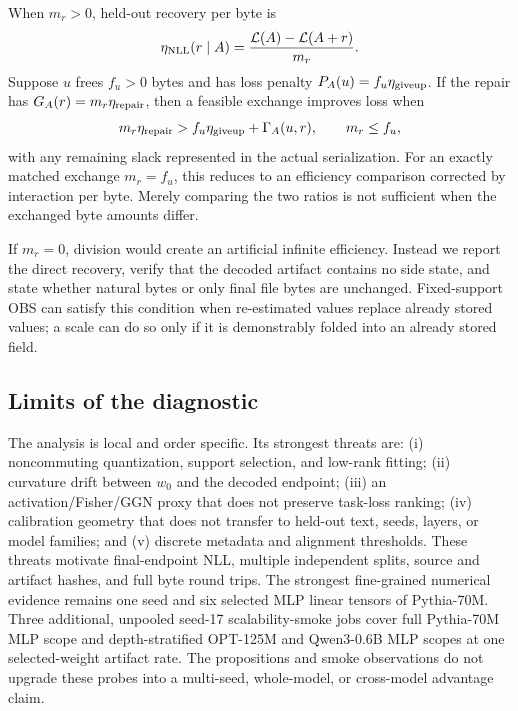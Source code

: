 When $m_r>0$, held-out recovery per byte is
\begin{equation}
\eta_{\rm NLL}(r\mid A)
=\frac{\mathcal{L}(A)-\mathcal{L}(A+r)}{m_r}.
\end{equation}
Suppose $u$ frees $f_u>0$ bytes and has loss penalty
$P_A(u)=f_u\eta_{\rm giveup}$.  If the repair has
$G_A(r)=m_r\eta_{\rm repair}$, then a feasible exchange improves loss
when
\begin{equation}
m_r\eta_{\rm repair}
>f_u\eta_{\rm giveup}+\Gamma_A(u,r),
\qquad m_r\le f_u,
\end{equation}
with any remaining slack represented in the actual serialization.
For an exactly matched exchange $m_r=f_u$, this reduces to an efficiency
comparison corrected by interaction per byte.  Merely comparing the two
ratios is not sufficient when the exchanged byte amounts differ.

If $m_r=0$, division would create an artificial infinite efficiency.
Instead we report the direct recovery, verify that the decoded artifact
contains no side state, and state whether natural bytes or only final
file bytes are unchanged.  Fixed-support OBS can satisfy this condition
when re-estimated values replace already stored values; a scale can do
so only if it is demonstrably folded into an already stored field.

\subsection{Limits of the diagnostic}

The analysis is local and order specific.  Its strongest threats are:
(i) noncommuting quantization, support selection, and low-rank fitting;
(ii) curvature drift between $w_0$ and the decoded endpoint;
(iii) an activation/Fisher/GGN proxy that does not preserve task-loss
ranking; (iv) calibration geometry that does not transfer to held-out
text, seeds, layers, or model families; and (v) discrete metadata and
alignment thresholds.  These threats motivate final-endpoint NLL,
multiple independent splits, source and artifact hashes, and full byte
round trips.  The strongest fine-grained numerical evidence remains one seed
and six selected MLP linear tensors of Pythia-70M.  Three additional, unpooled
seed-17 scalability-smoke jobs cover full Pythia-70M MLP scope and
depth-stratified OPT-125M and Qwen3-0.6B MLP scopes at one selected-weight
artifact rate.  The propositions and smoke observations do not upgrade these
probes into a multi-seed, whole-model, or cross-model advantage claim.
